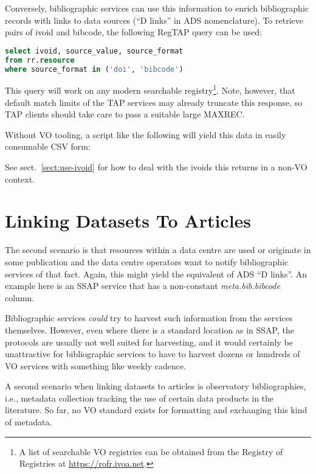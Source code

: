 \documentclass[11pt,a4paper]{ivoa}
\begin{document}
Conversely, bibliographic services can use this information to enrich
bibliographic records with links to data sources (``D links'' in ADS
nomenclature).  To retrieve pairs of ivoid and bibcode, the following
RegTAP \citep{2019ivoa.spec.1011D} query can be used:

\begin{lstlisting}[language=SQL]
select ivoid, source_value, source_format
from rr.resource
where source_format in ('doi', 'bibcode')
\end{lstlisting}

This query will work on any modern searchable registry\footnote{A list
of searchable VO registries can be obtained from the Registry of
Registries at \url{https://rofr.ivoa.net}.}.  Note, however, that
default match limits of the TAP services may already truncate this
response, so TAP clients should take care to pass a suitable large
MAXREC.

Without VO tooling, a script like the following will yield this data in
easily consumable CSV form:



See sect.~\ref{sect:use-ivoid} for how to deal with the ivoids this
returns in a non-VO context.


\section{Linking Datasets To Articles}

The second scenario is that resources within a data centre are used or
originate in some publication and the data centre operators want to
notify bibliographic services of that fact.  Again, this might yield the
equivalent of ADS ``D links''.  An example here is an SSAP
\citep{2012ivoa.spec.0210T} service that has a non-constant
\textsl{meta.bib.bibcode} column.

Bibliographic services \emph{could} try to harvest such information from
the services themselves.  However, even where there is a standard
location as in SSAP, the protocols are usually not well suited for
harvesting, and it would certainly be unattractive for bibliographic
services to have to harvest dozens or hundreds of VO services with
something like weekly cadence.

A second scenario when linking datasets to articles is observatory
bibliographies, i.e., metadata collection tracking the use of certain
data products in the literature.  So far, no VO standard exists for
formatting and exchanging this kind of metadata.
\end{document}
